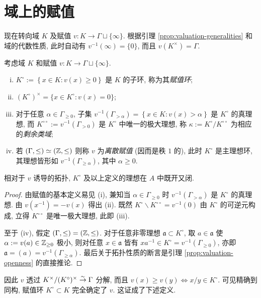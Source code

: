 \section{域上的赋值}\label{sec:valued-field}
现在转向域 $K$ 及赋值 $v: K \to \Gamma \sqcup \{\infty\}$. 根据引理 \ref{prop:valuation-generalities} 和域的代数性质, 此时自动有 $v^{-1}(\infty)=\{0\}$, 而且 $v(K^\times) = \Gamma$.

\begin{definition-theorem}\label{def:valuation-field}  
	考虑域 $K$ 和赋值 $v: K \to \Gamma \sqcup \{\infty\}$.
	\begin{enumerate}[(i)]
		\item $K^\circ := \left\{x \in K: v(x) \geq 0 \right\}$ 是 $K$ 的子环, 称为其\emph{赋值环};
		\item $(K^\circ)^\times = \{x \in K^\circ: v(x)=0 \}$;
		\item 对于任意 $\alpha \in \Gamma_{\geq 0}$, 子集 $v^{-1}(\Gamma_{> \alpha}) = \left\{ x \in K : v(x) > \alpha \right\}$ 是 $K^\circ$ 的真理想, 而 $K^{\circ\circ} := v^{-1}(\Gamma_{>0})$ 是 $K^\circ$ 中唯一的极大理想, 称 $\kappa := K^\circ/K^{\circ\circ}$ 为相应的\emph{剩余类域};
		\item 若 $(\Gamma, \leq) \simeq (\mathbb{Z}, \leq)$ 则称 $v$ 为\emph{离散赋值} (因而是秩 $1$ 的), 此时 $K^\circ$ 是主理想环, 其理想皆形如 $v^{-1}(\Gamma_{\geq \alpha})$, 其中 $\alpha \geq 0$. 
	\end{enumerate}
	相对于 $v$ 诱导的拓扑, $K^\circ$ 及以上定义的理想在 $A$ 中既开又闭.
\end{definition-theorem}
\begin{proof}
	由赋值的基本定义易见 (i), 兼知当 $\alpha \in \Gamma_{\geq 0}$ 时 $v^{-1}(\Gamma_{> \alpha})$ 是 $K^\circ$ 的真理想. 由 $v(x^{-1}) = -v(x)$ 得出 (ii). 既然 $K^\circ \smallsetminus K^{\circ\circ} = v^{-1}(0)$ 由 $K^\circ$ 的可逆元构成, 立得 $K^{\circ\circ}$ 是唯一极大理想, 此即 (iii).
	
	至于 (iv), 假定 $(\Gamma, \leq) = (\mathbb{Z}, \leq)$. 对于任意非零理想 $\mathfrak{a} \subset K^\circ$, 取 $a \in \mathfrak{a}$ 使 $\alpha := v(a) \in \mathbb{Z}_{\geq 0}$ 极小, 则对任意 $x \in \mathfrak{a}$ 皆有 $xa^{-1} \in K^\circ = v^{-1}(\Gamma_{\geq 0})$, 亦即 $\mathfrak{a} = (a) = v^{-1}(\Gamma_{\geq \alpha})$. 最后关于拓扑性质的断言是引理 \ref{prop:valuation-openness} 的直接推论.
\end{proof}
因此 $v$ 透过 $K^\times/(K^\circ)^\times \stackrel{\sim}{\rightarrow} \Gamma$ 分解, 而且 $v(x) \geq v(y) \iff x/y \in K^\circ$. 可见精确到同构, 赋值环 $K^\circ \subset K$ 完全确定了 $v$. 这证成了下述定义.

